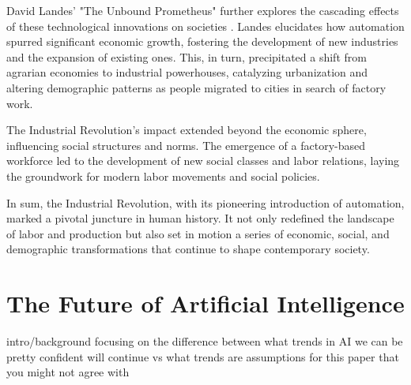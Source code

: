 \documentclass{article}
\begin{document}
David Landes' "The Unbound Prometheus" further explores the cascading effects of these technological innovations on societies \cite{Landes2003Unbound}. Landes elucidates how automation spurred significant economic growth, fostering the development of new industries and the expansion of existing ones. This, in turn, precipitated a shift from agrarian economies to industrial powerhouses, catalyzing urbanization and altering demographic patterns as people migrated to cities in search of factory work.

The Industrial Revolution's impact extended beyond the economic sphere, influencing social structures and norms. The emergence of a factory-based workforce led to the development of new social classes and labor relations, laying the groundwork for modern labor movements and social policies.

In sum, the Industrial Revolution, with its pioneering introduction of automation, marked a pivotal juncture in human history. It not only redefined the landscape of labor and production but also set in motion a series of economic, social, and demographic transformations that continue to shape contemporary society.

\section{The Future of Artificial Intelligence}
\label{sec:ArtificialIntelligence}

intro/background focusing on the difference between what trends in AI we can be pretty confident will continue vs what trends are assumptions for this paper that you might not agree with
\end{document}
